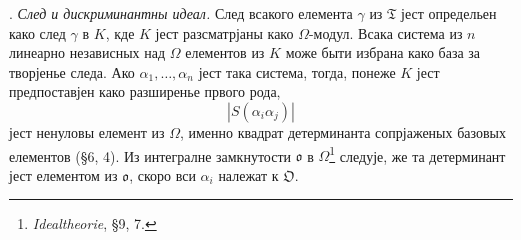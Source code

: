 \documentclass[11pt]{article}
\newcommand{\mo}{\mathfrak{o}}
\newcommand{\mO}{\mathfrak{O}}
\newcommand{\mT}{\mathfrak{T}}
\begin{document}
\setcounter{footnote}{33}

. \emph{След и дискриминантны идеал.} След всакого елемента $\gamma$ из $\mT$ јест определьен како след $\gamma$ в $K$, кде $K$ јест разсматрјаны како $\Omega$-модул. Всака система из $n$ линеарно независных над $\Omega$ елементов из $K$ може быти избрана како база за творјенье следа. Ако $\alpha_1,\ldots,\alpha_n$ јест така система, тогда, понеже $K$ јест предпоставјен како разширенье првого рода,
\[
        |S(\alpha_i\alpha_j)|
\]
јест ненуловы елемент из $\Omega$, именно квадрат детерминанта сопрјаженых базовых елементов (§6, 4). Из интегралне замкнутости $\mo$ в $\Omega$\footnote{\emph{Idealtheorie}, §9, 7.} следује, же та детерминант јест елементом из $\mo$, скоро вси $\alpha_i$ належат к $\mO$.
\end{document}
